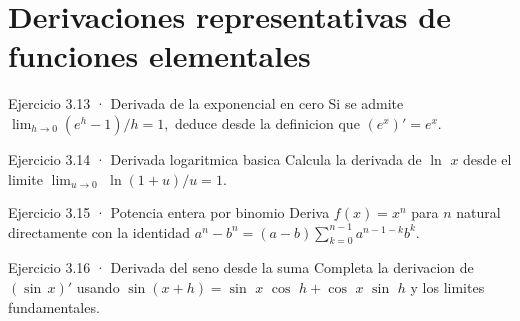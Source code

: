 \documentclass[10pt,a4paper,oneside,openany]{book}
\begin{document}
\section{Derivaciones representativas de funciones elementales}
\begin{PSevenExerciseFixed}{Ejercicio 3.13 · Derivada de la exponencial en cero}
Si se admite \(\lim_{h\to 0}(e^h-1)/h=1,\) deduce desde la definicion que \((e^x)'=e^x\).
\end{PSevenExerciseFixed}
\begin{PSevenExerciseFixed}{Ejercicio 3.14 · Derivada logaritmica basica}
Calcula la derivada de \(\ln\) \(x\) desde el limite \(\lim_{u\to 0}\) \(\ln(1+u)/u=1\).
\end{PSevenExerciseFixed}
\begin{PSevenExerciseFixed}{Ejercicio 3.15 · Potencia entera por binomio}
Deriva \(f(x)=x^n\) para \(n\) natural directamente con la identidad \(a^n-b^n=(a-b)\sum_{k=0}^{n-1}a^{n-1-k}b^k\).
\end{PSevenExerciseFixed}
\begin{PSevenExerciseFixed}{Ejercicio 3.16 · Derivada del seno desde la suma}
Completa la derivacion de \((\sin\,x)'\) usando \(\sin(x+h)=\sin\) \(x\) \(\cos\) \(h+\cos\) \(x\) \(\sin\) \(h\) y los limites fundamentales.
\end{PSevenExerciseFixed}
\end{document}

